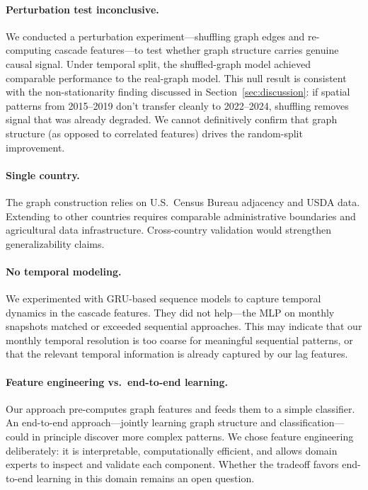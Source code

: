 \documentclass[preprint,12pt,authoryear]{elsarticle}
\begin{document}
\paragraph{Perturbation test inconclusive.} We conducted a perturbation experiment---shuffling graph edges and re-computing cascade features---to test whether graph structure carries genuine causal signal. Under temporal split, the shuffled-graph model achieved comparable performance to the real-graph model. This null result is consistent with the non-stationarity finding discussed in Section~\ref{sec:discussion}: if spatial patterns from 2015--2019 don't transfer cleanly to 2022--2024, shuffling removes signal that was already degraded. We cannot definitively confirm that graph structure (as opposed to correlated features) drives the random-split improvement.

\paragraph{Single country.} The graph construction relies on U.S.\ Census Bureau adjacency and USDA data. Extending to other countries requires comparable administrative boundaries and agricultural data infrastructure. Cross-country validation would strengthen generalizability claims.

\paragraph{No temporal modeling.} We experimented with GRU-based sequence models to capture temporal dynamics in the cascade features. They did not help---the MLP on monthly snapshots matched or exceeded sequential approaches. This may indicate that our monthly temporal resolution is too coarse for meaningful sequential patterns, or that the relevant temporal information is already captured by our lag features.

\paragraph{Feature engineering vs.\ end-to-end learning.} Our approach pre-computes graph features and feeds them to a simple classifier. An end-to-end approach---jointly learning graph structure and classification---could in principle discover more complex patterns. We chose feature engineering deliberately: it is interpretable, computationally efficient, and allows domain experts to inspect and validate each component. Whether the tradeoff favors end-to-end learning in this domain remains an open question.
\end{document}
